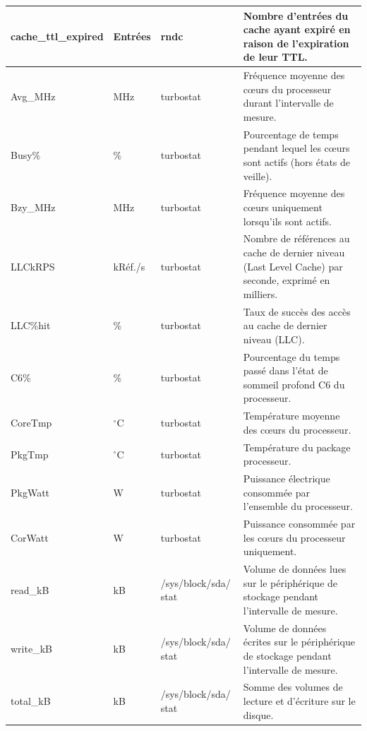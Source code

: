 \documentclass[12pt, a4paper]{report}
\begin{document}
\begin{longtable}{|p{3.5cm}|p{2cm}|p{3cm}|p{7cm}|}
		cache\_ttl\_expired & Entrées & rndc & Nombre d'entrées du cache ayant expiré en raison de l'expiration de leur TTL. \\
		\hline


		Avg\_MHz & MHz & turbostat & Fréquence moyenne des cœurs du processeur durant l'intervalle de mesure. \\
		\hline

		Busy\% & \% & turbostat & Pourcentage de temps pendant lequel les cœurs sont actifs (hors états de veille). \\
		\hline

		Bzy\_MHz & MHz & turbostat & Fréquence moyenne des cœurs uniquement lorsqu'ils sont actifs. \\
		\hline

		LLCkRPS & kRéf./s & turbostat & Nombre de références au cache de dernier niveau (Last Level Cache) par seconde, exprimé en milliers. \\
		\hline

		LLC\%hit & \% & turbostat & Taux de succès des accès au cache de dernier niveau (LLC). \\
		\hline

		C6\% & \% & turbostat & Pourcentage du temps passé dans l'état de sommeil profond C6 du processeur. \\
		\hline

		CoreTmp & $^\circ$C & turbostat & Température moyenne des cœurs du processeur. \\
		\hline

		PkgTmp & $^\circ$C & turbostat & Température du package processeur. \\
		\hline

		PkgWatt & W & turbostat & Puissance électrique consommée par l'ensemble du processeur. \\
		\hline

		CorWatt & W & turbostat & Puissance consommée par les cœurs du processeur uniquement. \\
		\hline

		read\_kB & kB & /sys/block/sda/ stat & Volume de données lues sur le périphérique de stockage pendant l'intervalle de mesure. \\
		\hline

		write\_kB & kB & /sys/block/sda/ stat & Volume de données écrites sur le périphérique de stockage pendant l'intervalle de mesure. \\
		\hline

		total\_kB & kB & /sys/block/sda/ stat & Somme des volumes de lecture et d'écriture sur le disque. \\
		\hline


\end{longtable}
\end{document}
